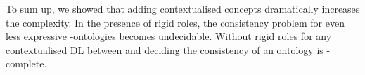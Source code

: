 To sum up, we showed that adding contextualised concepts dramatically increases the complexity. In
the presence of rigid roles, the consistency problem for even less expressive \ELALCplus-ontologies
becomes undecidable. Without rigid roles for any contextualised DL between \ALCALCplus and
\SHOISHOIplus deciding the consistency of an ontology is \TwoExpTime-complete.




